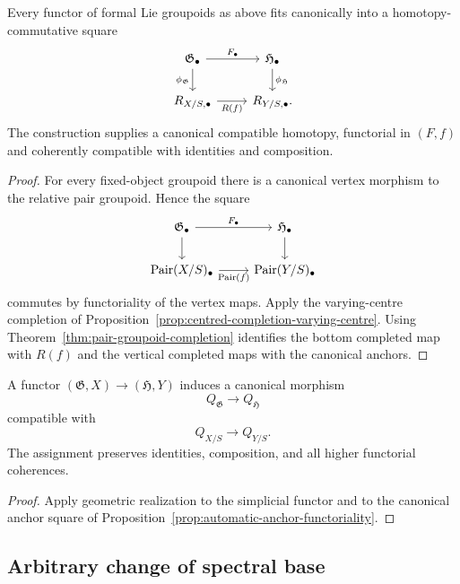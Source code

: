\begin{proposition}
\label{prop:automatic-anchor-functoriality}
Every functor of formal Lie groupoids as above fits canonically into a
homotopy-commutative square
\[
\begin{tikzcd}
\mathfrak G_\bullet \arrow[r,"F_\bullet"] \arrow[d,"\phi_{\mathfrak G}"'] &
\mathfrak H_\bullet \arrow[d,"\phi_{\mathfrak H}"]\\
R_{X/S,\bullet} \arrow[r,"R(f)"'] &
R_{Y/S,\bullet}.
\end{tikzcd}
\]
The construction supplies a canonical compatible homotopy, functorial in
$(F,f)$ and coherently compatible with identities and composition.
\end{proposition}

\begin{proof}
For every fixed-object groupoid there is a canonical vertex morphism to the
relative pair groupoid.  Hence the square
\[
\begin{tikzcd}
\mathfrak G_\bullet \arrow[r,"F_\bullet"] \arrow[d] &
\mathfrak H_\bullet \arrow[d]\\
\operatorname{Pair}(X/S)_\bullet
\arrow[r,"\operatorname{Pair}(f)"'] &
\operatorname{Pair}(Y/S)_\bullet
\end{tikzcd}
\]
commutes by functoriality of the vertex maps.  Apply the varying-centre
completion of Proposition~\ref{prop:centred-completion-varying-centre}.
Using
Theorem~\ref{thm:pair-groupoid-completion} identifies the bottom completed
map with $R(f)$ and the vertical completed maps with the canonical anchors.
\end{proof}

\begin{proposition}
\label{prop:quotient-functoriality}
A functor
$(\mathfrak G,X)\to(\mathfrak H,Y)$
induces a canonical morphism
\[
    Q_{\mathfrak G}\longrightarrow Q_{\mathfrak H}
\]
compatible with
\[
    Q_{X/S}\longrightarrow Q_{Y/S}.
\]
The assignment preserves identities, composition, and all higher
functorial coherences.
\end{proposition}

\begin{proof}
Apply geometric realization to the simplicial functor and to the canonical
anchor square of
Proposition~\ref{prop:automatic-anchor-functoriality}.
\end{proof}

\subsection{Arbitrary change of spectral base}

